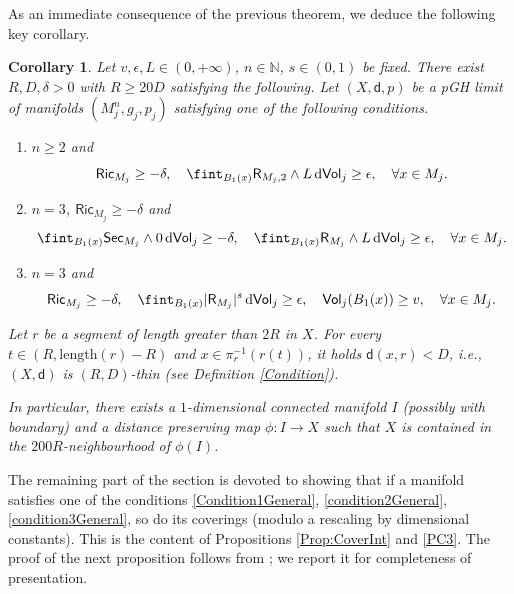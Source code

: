 \documentclass[10pt]{article}
\newtheorem{corollary}[thm]{Corollary}
\theoremstyle{definition}
\newcommand{\bb}[1]{\mathbb{#1}}
\newcommand{\ssf}[1]{\mathsf{#1}}
\newcommand{\sd}{\mathsf{d}}
\newcommand{\R}{\mathsf{R}}
\newcommand{\de}{{\rm d}}
\begin{document}
As an immediate consequence of the previous theorem, we deduce the following key corollary.

\begin{corollary} \label{CorollarySNP}
    Let $v,\epsilon,L \in (0,+\infty)$, $n \in \bb{N}$, $s \in (0,1)$ be fixed. There exist $R,D,\delta>0$ with $R \geq 20D$ satisfying the following. Let $(X,\sd,p)$ be a pGH limit of manifolds $(M^n_j,g_j,p_j)$ satisfying one of the following conditions.
    \begin{enumerate}
        \item  $n\geq 2$ and
    \begin{equation} \label{Condition1}
    \ssf{Ric}_{M_j} \geq -\delta, \quad
     \fint_{B_1(x)} \R_{M_j,2} \wedge L \,\de\ssf{Vol}_j  \geq \epsilon, \quad \forall x \in M_j.
    \end{equation}
    \item $n=3$, $\ssf{Ric}_{M_j} \geq -\delta$ and
    \begin{equation} \label{condition2}
    \fint_{B_1(x)} \ssf{Sec}_{M_j} \wedge 0 \, \de \ssf{Vol}_j  \geq -\delta, \quad  \fint_{B_1(x)} \R_{M_j} \wedge L \,\de\ssf{Vol}_j  \geq \epsilon, \quad \forall x \in M_j.
    \end{equation}
    \item $n=3$ and
    \begin{equation} \label{condition3}
    \ssf{Ric}_{M_j} \geq -\delta, \quad  \fint_{B_1(x)} |\R_{M_j}|^s \,\de\ssf{Vol}_j  \geq \epsilon, \quad \ssf{Vol}_j(B_1(x)) \geq v, \quad \forall x \in M_j.
    \end{equation}
    \end{enumerate}
    Let $r$ be a segment of length greater than $2R$ in $X$. For every $t \in (R,\mathrm{length}(r)-R)$ and $x \in \pi_r^{-1}(r(t))$, it holds $\sd(x,r) < D$, i.e., $(X,\sd)$ is $(R,D)$-thin (see Definition \ref{Condition}).

    In particular, there exists a $1$-dimensional connected manifold $I$ (possibly with boundary) and a distance preserving map $\phi:I \to X$ such that $X$ is contained in the $200R$-neighbourhood of $\phi(I)$.
    \end{corollary}

The remaining part of the section is devoted to showing that if a manifold satisfies one of the conditions \eqref{Condition1General}, \eqref{condition2General}, \eqref{condition3General}, so do its coverings (modulo a rescaling by dimensional constants). This is the content of Propositions \ref{Prop:CoverInt} and \ref{PC3}. The proof of the next proposition follows from \cite[Lemma 1.6]{kapovitch2011structurefundamentalgroupsmanifolds}; we report it for completeness of presentation.
\end{document}
